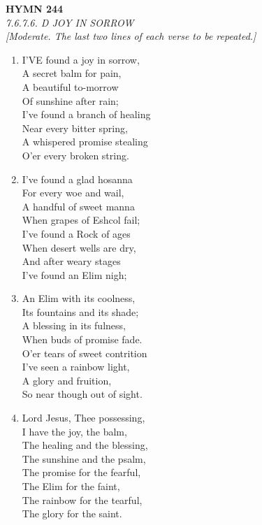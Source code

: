 \documentclass[11pt,a4paper]{article}
\begin{document}
\newpage
\begin{center}
    {\Large \textbf{HYMN 244}}
    \\
    \textit{7.6.7.6. D JOY IN SORROW}
    \\
    \textit{\small [Moderate. The last two lines of each verse to be repeated.]}
\end{center}
\vspace{1em}

\begin{enumerate}
    \item I'VE found a joy in sorrow, \\
            A secret balm for pain, \\
        A beautiful to-morrow \\
            Of sunshine after rain; \\
        I've found a branch of healing \\
            Near every bitter spring, \\
        A whispered promise stealing \\
            O'er every broken string.

    \item I've found a glad hosanna \\
            For every woe and wail, \\
        A handful of sweet manna \\
            When grapes of Eshcol fail; \\
        I've found a Rock of ages \\
            When desert wells are dry, \\
        And after weary stages \\
            I've found an Elim nigh;

    \item An Elim with its coolness, \\
            Its fountains and its shade; \\
        A blessing in its fulness, \\
            When buds of promise fade. \\
        O'er tears of sweet contrition \\
            I've seen a rainbow light, \\
        A glory and fruition, \\
            So near though out of sight.

    \item Lord Jesus, Thee possessing, \\
            I have the joy, the balm, \\
        The healing and the blessing, \\
            The sunshine and the psalm, \\
        The promise for the fearful, \\
            The Elim for the faint, \\
        The rainbow for the tearful, \\
            The glory for the saint.

\end{enumerate}
\end{document}
